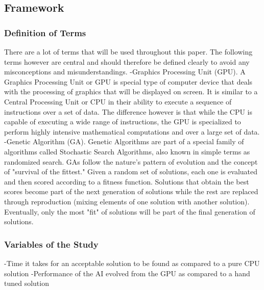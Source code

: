 \subsection*{Framework}
\subsubsection*{Definition of Terms}
There are a lot of terms that will be used throughout this paper.
The following terms however are central and should therefore be defined clearly
to avoid any misconceptions and misunderstandings.
-Graphics Processing Unit (GPU). A Graphics Processing Unit or GPU is special type
of computer device that deals with the processing of graphics that will be displayed
on screen. It is similar to a Central Processing Unit or CPU in their ability to execute
a sequence of instructions over a set of data. The difference however is that while the
CPU is capable of executing a wide range of instructions, the GPU is specialized to perform
highly intensive mathematical computations and over a large set of data.
-Genetic Algorithm (GA). Genetic Algorithms are part of a special family of algorithms
called Stochastic Search Algorithms, also known in simple terms as randomized search. GAs
follow the nature's pattern of evolution and the concept of "survival of the fittest." Given
a random set of solutions, each one is evaluated and then scored according to a fitness function.
Solutions that obtain the best scores become part of the next generation of solutions while the
rest are replaced through reproduction (mixing elements of one solution with another solution).
Eventually, only the most "fit" of solutions will be part of the final generation of solutions.


\subsubsection*{Variables of the Study}
-Time it takes for an acceptable solution to be found as compared to
a pure CPU solution
-Performance of the AI evolved from the GPU as compared to a hand tuned solution